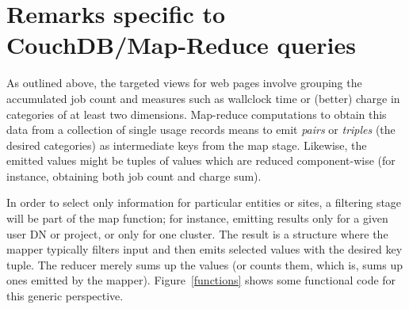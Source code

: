 \section*{Remarks specific to CouchDB/Map-Reduce queries}

As outlined above, the targeted views for \griddk{} web pages involve
grouping the accumulated job count and measures such as wallclock time
or (better) charge in categories of at least two dimensions.
Map-reduce computations to obtain this data from a collection of
single usage records means to emit \emph{pairs} or \emph{triples} (the
desired categories) as intermediate keys from the map stage. Likewise,
the emitted values might be tuples of values which are reduced
component-wise (for instance, obtaining both job count and charge
sum).

In order to select only information for particular entities or sites,
a filtering stage will be part of the map function; for instance,
emitting results only for a given user DN or project, or only for one
cluster.  The result is a structure where the mapper typically filters
input and then emits selected values with the desired key tuple. The
reducer merely sums up the values (or counts them, which is, sums up
ones emitted by the mapper). Figure~\ref{functions} shows some
functional code for this generic perspective.

